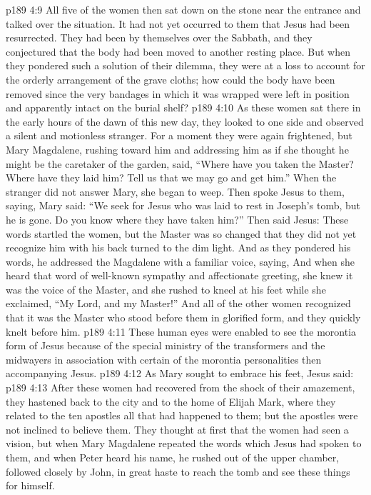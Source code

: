 \vs p189 4:9 All five of the women then sat down on the stone near the entrance and talked over the situation. It had not yet occurred to them that Jesus had been resurrected. They had been by themselves over the Sabbath, and they conjectured that the body had been moved to another resting place. But when they pondered such a solution of their dilemma, they were at a loss to account for the orderly arrangement of the grave cloths; how could the body have been removed since the very bandages in which it was wrapped were left in position and apparently intact on the burial shelf?
\vs p189 4:10 \pc As these women sat there in the early hours of the dawn of this new day, they looked to one side and observed a silent and motionless stranger. For a moment they were again frightened, but Mary Magdalene, rushing toward him and addressing him as if she thought he might be the caretaker of the garden, said, “Where have you taken the Master? Where have they laid him? Tell us that we may go and get him.” When the stranger did not answer Mary, she began to weep. Then spoke Jesus to them, saying,  Mary said: “We seek for Jesus who was laid to rest in Joseph’s tomb, but he is gone. Do you know where they have taken him?” Then said Jesus:  These words startled the women, but the Master was so changed that they did not yet recognize him with his back turned to the dim light. And as they pondered his words, he addressed the Magdalene with a familiar voice, saying,  And when she heard that word of well\hyp{}known sympathy and affectionate greeting, she knew it was the voice of the Master, and she rushed to kneel at his feet while she exclaimed, “My Lord, and my Master!” And all of the other women recognized that it was the Master who stood before them in glorified form, and they quickly knelt before him.
\vs p189 4:11 These human eyes were enabled to see the morontia form of Jesus because of the special ministry of the transformers and the midwayers in association with certain of the morontia personalities then accompanying Jesus.
\vs p189 4:12 \pc As Mary sought to embrace his feet, Jesus said: 
\vs p189 4:13 After these women had recovered from the shock of their amazement, they hastened back to the city and to the home of Elijah Mark, where they related to the ten apostles all that had happened to them; but the apostles were not inclined to believe them. They thought at first that the women had seen a vision, but when Mary Magdalene repeated the words which Jesus had spoken to them, and when Peter heard his name, he rushed out of the upper chamber, followed closely by John, in great haste to reach the tomb and see these things for himself.
